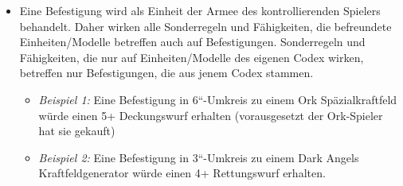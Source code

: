\begin{itemize}

 \item Eine Befestigung wird als Einheit der Armee des kontrollierenden Spielers
  behandelt. Daher wirken alle Sonderregeln und Fähigkeiten, die befreundete
  Einheiten/Modelle betreffen auch auf Befestigungen.
Sonderregeln und Fähigkeiten, die nur auf Einheiten/Modelle des eigenen Codex
wirken, betreffen nur Befestigungen, die aus jenem Codex stammen.
\begin{itemize}
 \item \textit{Beispiel 1:} Eine Befestigung in 6“-Umkreis zu einem Ork
  Späzialkraftfeld würde einen 5+ Deckungswurf erhalten (vorausgesetzt der
  Ork-Spieler hat sie gekauft)
 \item \textit{Beispiel 2:} Eine Befestigung in 3“-Umkreis zu einem Dark Angels
  Kraftfeldgenerator würde einen 4+ Rettungswurf erhalten.
\end{itemize}


\end{itemize}
